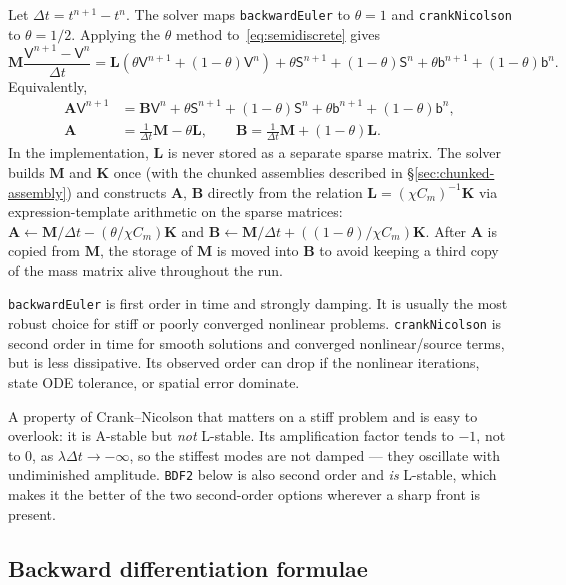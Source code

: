 \documentclass[11pt,a4paper]{article}
\newcommand{\code}[1]{\texttt{\small #1}}
\newcommand{\Mmass}{\mathbf{M}}
\newcommand{\Kstif}{\mathbf{K}}
\newcommand{\Lop}{\mathbf{L}}
\newcommand{\Aimp}{\mathbf{A}}
\newcommand{\Bimp}{\mathbf{B}}
\begin{document}
Let $\Delta t=t^{n+1}-t^n$. The solver maps \code{backwardEuler} to
$\theta=1$ and \code{crankNicolson} to $\theta=1/2$. Applying the
$\theta$ method to~\eqref{eq:semidiscrete} gives
\begin{equation}
  \Mmass\frac{\mathsf{V}^{n+1}-\mathsf{V}^{n}}{\Delta t}
  =
  \Lop\left(\theta\mathsf{V}^{n+1}+(1-\theta)\mathsf{V}^{n}\right)
  +
  \theta\mathsf{S}^{n+1}
  +(1-\theta)\mathsf{S}^{n}
  +\theta\mathsf{b}^{n+1}
  +(1-\theta)\mathsf{b}^{n}.
  \label{eq:theta}
\end{equation}
Equivalently,
\begin{align}
  \Aimp \mathsf{V}^{n+1}
  &=
  \Bimp \mathsf{V}^{n}
  +\theta\mathsf{S}^{n+1}
  +(1-\theta)\mathsf{S}^{n}
  +\theta\mathsf{b}^{n+1}
  +(1-\theta)\mathsf{b}^{n},
  \label{eq:implicit-system}\\
  \Aimp &= \frac{1}{\Delta t}\Mmass-\theta\Lop,\qquad
  \Bimp = \frac{1}{\Delta t}\Mmass+(1-\theta)\Lop.
\end{align}
In the implementation, $\Lop$ is never stored as a separate sparse matrix. The
solver builds $\Mmass$ and $\Kstif$ once (with the chunked assemblies described
in \S\ref{sec:chunked-assembly}) and constructs $\Aimp$, $\Bimp$ directly from
the relation $\Lop=(\chi C_m)^{-1}\Kstif$ via expression-template arithmetic on
the sparse matrices: $\Aimp\leftarrow\Mmass/\Delta t-(\theta/\chi C_m)\Kstif$
and $\Bimp\leftarrow\Mmass/\Delta t+((1-\theta)/\chi C_m)\Kstif$. After
$\Aimp$ is copied from $\Mmass$, the storage of $\Mmass$ is moved into $\Bimp$
to avoid keeping a third copy of the mass matrix alive throughout the run.

\code{backwardEuler} is first order in time and strongly damping. It is usually
the most robust choice for stiff or poorly converged nonlinear problems.
\code{crankNicolson} is second order in time for smooth solutions and converged
nonlinear/source terms, but is less dissipative. Its observed order can drop if
the nonlinear iterations, state ODE tolerance, or spatial error dominate.

A property of Crank--Nicolson that matters on a stiff problem and is easy to
overlook: it is A-stable but \emph{not} L-stable. Its amplification factor tends
to $-1$, not to $0$, as $\lambda\Delta t\to-\infty$, so the stiffest modes are
not damped --- they oscillate with undiminished amplitude. \code{BDF2} below is
also second order and \emph{is} L-stable, which makes it the better of the two
second-order options wherever a sharp front is present.

\subsection{Backward differentiation formulae}
\label{sec:bdf}
\end{document}

